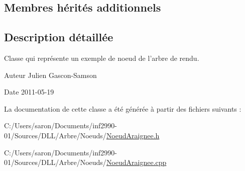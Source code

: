 \subsection*{Membres hérités additionnels}


\subsection{Description détaillée}
Classe qui représente un exemple de noeud de l'arbre de rendu. 

\begin{DoxyAuthor}{Auteur}
Julien Gascon-\/\-Samson 
\end{DoxyAuthor}
\begin{DoxyDate}{Date}
2011-\/05-\/19 
\end{DoxyDate}


La documentation de cette classe a été générée à partir des fichiers suivants \-:\begin{DoxyCompactItemize}
\item 
C\-:/\-Users/saron/\-Documents/inf2990-\/01/\-Sources/\-D\-L\-L/\-Arbre/\-Noeuds/\hyperlink{_noeud_araignee_8h}{Noeud\-Araignee.\-h}\item 
C\-:/\-Users/saron/\-Documents/inf2990-\/01/\-Sources/\-D\-L\-L/\-Arbre/\-Noeuds/\hyperlink{_noeud_araignee_8cpp}{Noeud\-Araignee.\-cpp}\end{DoxyCompactItemize}
